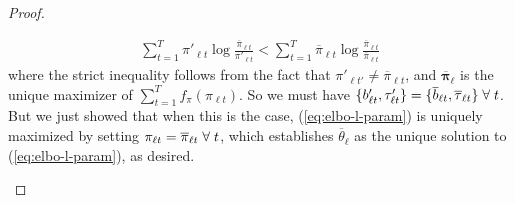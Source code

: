 \begin{proof}
\begin{enumerate}[label=\roman*.]
\begin{align*}
    \sum_{t=1}^T \pi'_{\ell t} \log \frac{\overline{\pi}_{\ell t}}{\pi'_{\ell t}} < \sum_{t=1}^T \overline{\pi}_{\ell t} \log \frac{\overline{\pi}_{\ell t}}{\overline{\pi}_{\ell t}} 
\end{align*}
where the strict inequality follows from the fact that $\pi'_{\ell t'} \neq \overline{\pi}_{\ell t}$, and $\overline{\pmb{\pi}}_\ell$ is the unique maximizer of $\sum_{t=1}^T f_\pi(\pi_{\ell t})$. So we must have $ \{b'_{\ell t}, \tau'_{\ell t}\} = \{\overline{b}_{\ell t}, \overline{\tau}_{\ell t}\} \;\forall\; t$. But we just showed that when this is the case, (\ref{eq:elbo-l-param}) is uniquely maximized by setting $\pi_{\ell t} = \overline{\pi}_{\ell t} \;\forall\; t$, which establishes $\overline{\theta}_\ell$ as the unique solution to (\ref{eq:elbo-l-param}), as desired.


\end{enumerate}
\end{proof}
